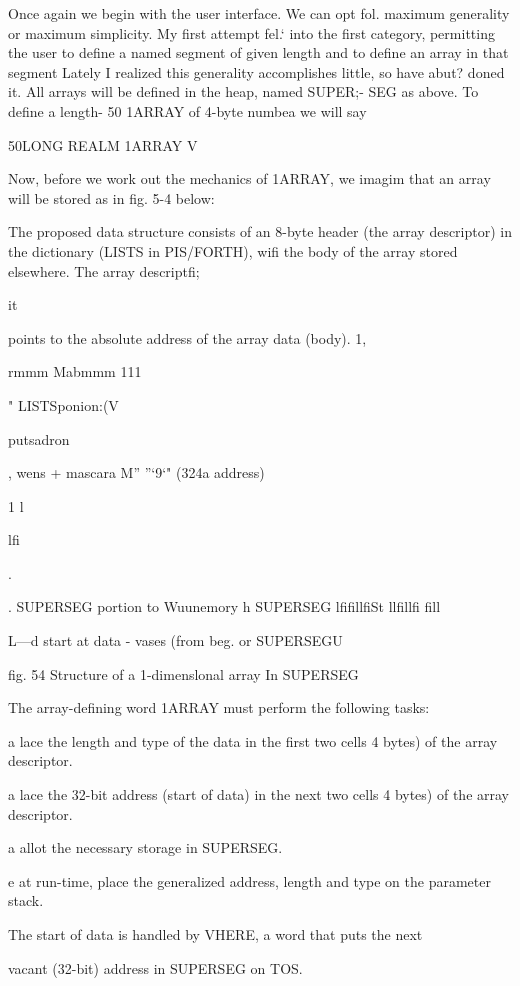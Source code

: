 Once again we begin with the user interface. We can opt fol.
maximum generality or maximum simplicity. My first attempt fel.‘
into the first category, permitting the user to define a named
segment of given length and to define an array in that segment
Lately I realized this generality accomplishes little, so have abut?
doned it. All arrays will be defined in the heap, named SUPER;-
SEG as above. To define a length- 50 1ARRAY of 4-byte numbea
we will say

50LONG REALM 1ARRAY V{

Now, before we work out the mechanics of 1ARRAY, we imagim
that an array will be stored as in fig. 5-4 below:

The proposed data structure consists of an 8-byte header (the
array descriptor) in the dictionary (LISTS in PIS/FORTH), wifi
the body of the array stored elsewhere. The array descriptfi;

it

points to the absolute address of the array data (body). 1,

rmmm Mabmmm 111

 

" LISTSponion:(V{putsadron

 

, wens + mascara
M” ”‘9‘" (324a address)

1 l

lfi%

.

. SUPERSEG portion to Wuunemory h SUPERSEG
lfifillfiSt llfillfi fill%

L—d start at data - vases (from beg. or SUPERSEGU

fig. 54 Structure of a 1-dimenslonal array In SUPERSEG

The array-defining word 1ARRAY must perform the following
tasks:

a lace the length and type of the data in the first two cells
4 bytes) of the array descriptor.

a lace the 32-bit address (start of data) in the next two cells
4 bytes) of the array descriptor.

a allot the necessary storage in SUPERSEG.

e at run-time, place the generalized address, length and type on
the parameter stack.

The start of data is handled by VHERE, a word that puts the next

vacant (32-bit) address in SUPERSEG on TOS.

}}
